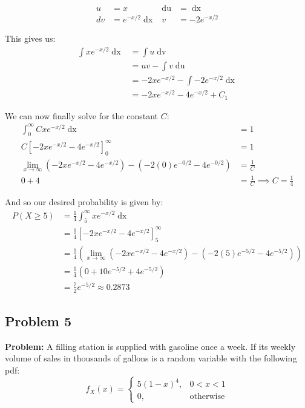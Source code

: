 \documentclass{article}
\newcommand*\eval[3]{\left[#1\right]_{#2}^{#3}}
\begin{document}
\begin{align*}
    u&=x & \mathop{du}&=\mathop{dx}\\
    dv&=e^{-x/2}\mathop{dx} & v&=-2e^{-x/2}
\end{align*}

This gives us:
\begin{align*}
    \int xe^{-x/2}\mathop{dx}&=\int u\mathop{dv}\tag{substitutions}\\
    &=uv-\int v\mathop{du}\tag{integration by parts}\\
    &=-2xe^{-x/2}-\int -2e^{-x/2}\mathop{dx}\tag{substitutions}\\
    &=-2xe^{-x/2}-4e^{-x/2}+C_1
\end{align*}

We can now finally solve for the constant $C$:
\begin{align*}
    \int_0^\infty Cxe^{-x/2}\mathop{dx}&=1\\
    C\eval{-2xe^{-x/2}-4e^{-x/2}}{0}{\infty}&=1\tag{solution above}\\
    \lim_{x\to\infty}(-2xe^{-x/2}-4e^{-x/2})-(-2(0)e^{-0/2}-4e^{-0/2})&=\frac{1}{C}\\
    0+4&=\frac{1}{C}\implies C=\frac{1}{4}
\end{align*}

And so our desired probability is given by:
\begin{align*}
    P(X\ge 5)&=\frac{1}{4}\int_5^\infty xe^{-x/2}\mathop{dx}\\
    &=\frac{1}{4}\eval{-2xe^{-x/2}-4e^{-x/2}}{5}{\infty}\tag{solution above}\\
    &=\frac{1}{4}\left(\lim_{x\to\infty}(-2xe^{-x/2}-4e^{-x/2})-(-2(5)e^{-5/2}-4e^{-5/2})\right)\\
    &=\frac{1}{4}\left(0+10e^{-5/2}+4e^{-5/2}\right)\\
    &=\frac{7}{2}e^{-5/2}\approx0.2873
\end{align*}

\subsection*{Problem 5}
\noindent\textbf{Problem:} A filling station is supplied with gasoline once a week. If its weekly volume of sales in thousands of gallons is a random variable with the following pdf:
\begin{equation*}
    f_X(x)=\begin{cases}
        5(1-x)^4,&0<x<1\\
        0,& \text{otherwise}
    \end{cases}
\end{equation*}
\end{document}
